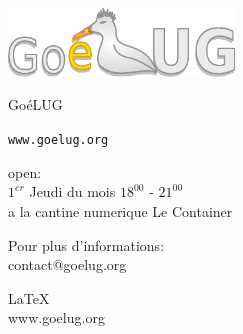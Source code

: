 \documentclass[a4paper]{leaflet}
\begin{document}
\sffamily

    \begin{minipage}{8.2cm}

		\begin{center}
	
		\vspace{42pt}
	
		\includegraphics[width=6cm]{goelug}
		
		\vspace{32pt}
	
		\huge
	
		Go\'{e}LUG
	
	
		\normalsize
	
		{\tt www.goelug.org}

		\vspace{42pt}
	
		\textsf{open:} \\[18pt]
		$ 1^{er} $ Jeudi du mois $ 18^{00} $ - $ 21^{00} $ \\

		a la cantine numerique
		Le Container	

		\vspace{52pt}
		
		\end{center}

    \end{minipage}

\newpage





\begin{center}
\textsf{
	Pour plus d'informations: \\
	contact@goelug.org
}

\small{\LaTeX{} \\
\textsf{www.goelug.org}}
	
\end{center}
\end{document}
